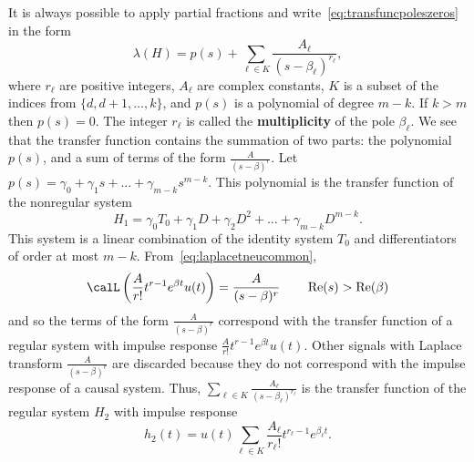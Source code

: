 \documentclass[11pt,a4paper]{book}
\theoremstyle{plain}
\numberwithin{equation}{section}
\renewcommand{\Re}{\operatorname{Re}}
\renewcommand{\Im}{\operatorname{Im}}
\newcommand{\term}{\textbf}
\renewcommand{\mid}{\; ; \;}
\begin{document}
It is always possible to apply partial fractions and write~\eqref{eq:transfuncpoleszeros} in the form
\[
\lambda(H) = p(s) + \sum_{\ell \in K} \frac{A_\ell}{(s - \beta_\ell)^{r_\ell}},
\]
where $r_\ell$ are positive integers, $A_\ell$ are complex constants, $K$ is a subset of the indices from $\{d,d+1,\dots,k\}$, and $p(s)$ is a polynomial of degree $m-k$.  If $k > m$ then $p(s) = 0$.  The integer $r_\ell$ is called the \term{multiplicity} of the pole $\beta_\ell$.  %
We see that the transfer function contains the summation of two parts: the polynomial $p(s)$, and a sum of terms of the form $\frac{A}{(s-\beta)^r}$.  Let $p(s) = \gamma_0 + \gamma_1 s + \dots + \gamma_{m-k}s^{m-k}$.  This polynomial is the transfer function of the nonregular system
\[
H_1 = \gamma_0 T_0 + \gamma_1 D + \gamma_2 D^2 + \dots + \gamma_{m-k} D^{m-k}.
\]
This system is a linear combination of the identity system $T_0$ and differentiators of order at most $m-k$.  From~\eqref{eq:laplacetneucommon},
\[
\calL\left( \frac{A}{r!} t^{r-1} e^{\beta t} u(t) \right) = \frac{A}{(s-\beta)^{r}} \qquad \Re(s) > \Re(\beta)
\]
and so the terms of the form $\frac{A}{(s-\beta)^r}$ correspond with the transfer function of a regular system with impulse response $\frac{A}{r!} t^{r-1} e^{\beta t} u(t)$.  Other signals with Laplace transform $\frac{A}{(s-\beta)^{r}}$ are discarded because they do not correspond with the impulse response of a causal system.  Thus, $\sum_{\ell \in K} \frac{A_\ell}{(s - \beta_\ell)^{r_\ell}}$ is the transfer function of the regular system $H_2$ with impulse response 
\[
h_2(t) = u(t) \sum_{\ell\in K} \frac{A_\ell}{r_\ell!} t^{r_\ell-1} e^{\beta_\ell t}.
\]
\end{document}
